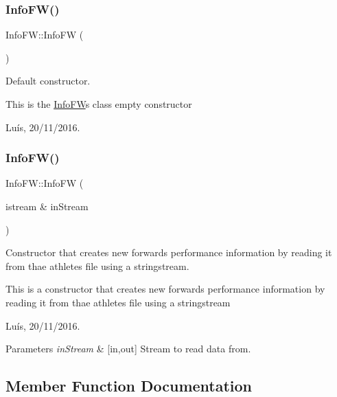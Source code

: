 \subsubsection{\texorpdfstring{Info\+F\+W()}{InfoFW()}\hspace{0.1cm}{\footnotesize\ttfamily [3/4]}}
{\footnotesize\ttfamily Info\+F\+W\+::\+Info\+FW (\begin{DoxyParamCaption}{ }\end{DoxyParamCaption})}



Default constructor. 

This is the \hyperlink{class_info_f_w}{Info\+FW}\textquotesingle{}s class empty constructor

Luís, 20/11/2016. \hypertarget{class_info_f_w_a2d29763451213dd0f92fee314e3ff2e9}{}\label{class_info_f_w_a2d29763451213dd0f92fee314e3ff2e9} 
\subsubsection{\texorpdfstring{Info\+F\+W()}{InfoFW()}\hspace{0.1cm}{\footnotesize\ttfamily [4/4]}}
{\footnotesize\ttfamily Info\+F\+W\+::\+Info\+FW (\begin{DoxyParamCaption}\item[{istream \&}]{in\+Stream }\end{DoxyParamCaption})}



Constructor that creates new forward\textquotesingle{}s performance information by reading it from thae athletes file using a stringstream. 

This is a constructor that creates new forward\textquotesingle{}s performance information by reading it from thae athletes file using a stringstream

Luís, 20/11/2016. 


\begin{DoxyParams}{Parameters}
{\em in\+Stream} & \mbox{[}in,out\mbox{]} Stream to read data from. \\
\hline
\end{DoxyParams}


\subsection{Member Function Documentation}
\hypertarget{class_info_f_w_af8af688ba3e796239736dd9ce450991f}{}\label{class_info_f_w_af8af688ba3e796239736dd9ce450991f} 
